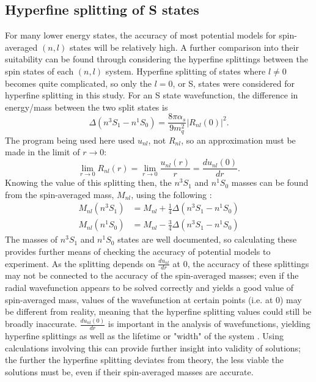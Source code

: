 \documentclass[10pt, twocolumn]{article}
\begin{document}
\subsection{Hyperfine splitting of S states}
For many lower energy states, the accuracy of most potential models for spin-averaged $(n,l)$ states will be relatively high. 
A further comparison into their suitability can be found through considering the hyperfine splittings between the spin states of each $(n,l)$ system. 
Hyperfine splitting of states where $l\neq0$ becomes quite complicated, so only the $l=0$, or S, states were considered for hyperfine splitting in this study. 
For an S state wavefunction, the difference in energy/mass between the two split states is
\begin{equation}
    \Delta(n^3S_1 - n^1S_0) = \frac{8\pi\alpha_s}{9m_q^2}|R_{nl}(0)|^2.    
\end{equation}
\cite{1} The program being used here used $u_{nl}$, not $R_{nl}$, so an approximation must be made in the limit of $r\to0$:
\begin{equation}
    \lim_{r\to0} R_{nl}(r) = \lim_{r\to0} \frac{u_{nl}(r)}{r} = \frac{du_{nl}(0)}{dr}.
\end{equation}
Knowing the value of this splitting then, the $n^3S_1$ and $n^1S_0$ masses can be found from the spin-averaged mass, $M_{nl}$, using the following \cite{1}:
\begin{align}
    M_{nl}(n^3S_1) &= M_{nl} + \frac14\Delta(n^3S_1 - n^1S_0) \\
    M_{nl}(n^1S_0) &= M_{nl} - \frac34\Delta(n^3S_1 - n^1S_0)
\end{align}
The masses of $n^3S_1$ and $n^1S_0$ states are well documented, so calculating these provides further means of checking the accuracy of potential models to experiment. 
As the splitting depends on $\frac{du_{nl}}{dr}$ at 0, the accuracy of these splittings may not be connected to the accuracy of the spin-averaged masses; even if the radial wavefunction appears to be solved correctly and yields a good value of spin-averaged mass, values of the wavefunction at certain points (i.e. at 0) may be different from reality, meaning that the hyperfine splitting values could still be broadly inaccurate.
$\frac{du_{nl}(0)}{dr}$ is important in the analysis of wavefunctions, yielding hyperfine splittings as well as the lifetime or "width" of the system \cite{1}. 
Using calculations involving this can provide further insight into validity of solutions; the further the hyperfine splitting deviates from theory, the less viable the solutions must be, even if their spin-averaged masses are accurate.
\end{document}
